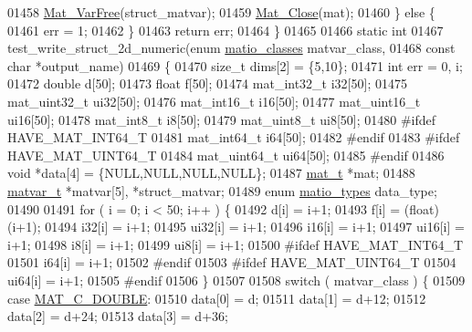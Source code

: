 \begin{DoxyCode}
{{{{{01458         \hyperlink{group___m_a_t_ga1d14716f7450530fd1c9d02413787f0e}{Mat\_VarFree}(struct\_matvar);
01459         \hyperlink{group___m_a_t_ga101c92ff7bde4a2d4615661beba09262}{Mat\_Close}(mat);
01460     \} \textcolor{keywordflow}{else} \{
01461         err = 1;
01462     \}
01463     \textcolor{keywordflow}{return} err;
01464 \}
01465 
01466 \textcolor{keyword}{static} \textcolor{keywordtype}{int}
01467 test\_write\_struct\_2d\_numeric(\textcolor{keyword}{enum} \hyperlink{group___m_a_t_gad4d60ae7b709fc81bfd744fb4c857c40}{matio\_classes} matvar\_class,
01468     \textcolor{keyword}{const} \textcolor{keywordtype}{char} *output\_name)
01469 \{
01470     \textcolor{keywordtype}{size\_t} dims[2] = \{5,10\};
01471     \textcolor{keywordtype}{int}    err = 0, i;
01472     \textcolor{keywordtype}{double}    d[50];
01473     \textcolor{keywordtype}{float}     f[50];
01474     mat\_int32\_t   i32[50];
01475     mat\_uint32\_t ui32[50];
01476     mat\_int16\_t   i16[50];
01477     mat\_uint16\_t ui16[50];
01478     mat\_int8\_t    i8[50];
01479     mat\_uint8\_t  ui8[50];
01480 \textcolor{preprocessor}{#ifdef HAVE\_MAT\_INT64\_T}
01481     mat\_int64\_t i64[50];
01482 \textcolor{preprocessor}{#endif}
01483 \textcolor{preprocessor}{#ifdef HAVE\_MAT\_UINT64\_T}
01484     mat\_uint64\_t ui64[50];
01485 \textcolor{preprocessor}{#endif}
01486     \textcolor{keywordtype}{void} *data[4] = \{NULL,NULL,NULL,NULL\};
01487     \hyperlink{struct__mat__t}{mat\_t} *mat;
01488     \hyperlink{group___m_a_t_structmatvar__t}{matvar\_t} *matvar[5], *struct\_matvar;
01489     \textcolor{keyword}{enum} \hyperlink{group___m_a_t_gacf7b3b879282b7ab3a51190e49bf3453}{matio\_types} data\_type;
01490 
01491     \textcolor{keywordflow}{for} ( i = 0; i < 50; i++ ) \{
01492           d[i] = i+1;
01493           f[i] = (float)(i+1);
01494         i32[i] = i+1;
01495        ui32[i] = i+1;
01496         i16[i] = i+1;
01497        ui16[i] = i+1;
01498          i8[i] = i+1;
01499         ui8[i] = i+1;
01500 \textcolor{preprocessor}{#ifdef HAVE\_MAT\_INT64\_T}
01501         i64[i] = i+1;
01502 \textcolor{preprocessor}{#endif}
01503 \textcolor{preprocessor}{#ifdef HAVE\_MAT\_UINT64\_T}
01504         ui64[i] = i+1;
01505 \textcolor{preprocessor}{#endif}
01506     \}
01507 
01508     \textcolor{keywordflow}{switch} ( matvar\_class ) \{
01509         \textcolor{keywordflow}{case} \hyperlink{group___m_a_t_ggad4d60ae7b709fc81bfd744fb4c857c40a5d70e0862e5bdb7bd86bf7ba5948f307}{MAT\_C\_DOUBLE}:
01510             data[0] = d;
01511             data[1] = d+12;
01512             data[2] = d+24;
01513             data[3] = d+36;
}}}}}
\end{DoxyCode}
